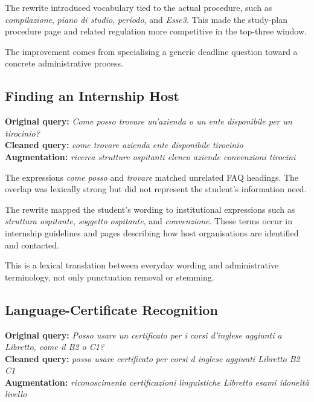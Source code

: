 \begin{effectbox}
The rewrite introduced vocabulary tied to the actual procedure, such as \emph{compilazione}, \emph{piano di studio}, \emph{periodo}, and \emph{Esse3}. This made the study-plan procedure page and related regulation more competitive in the top-three window.
\end{effectbox}

The improvement comes from specialising a generic deadline question toward a concrete administrative process.

\subsection{Finding an Internship Host}

\textbf{Original query:} \emph{Come posso trovare un'azienda o un ente disponibile per un tirocinio?}\\
\textbf{Cleaned query:} \emph{come trovare azienda ente disponibile tirocinio}\\
\textbf{Augmentation:} \emph{ricerca strutture ospitanti elenco aziende convenzioni tirocini}

\begin{failurebox}
The expressions \emph{come posso} and \emph{trovare} matched unrelated FAQ headings. The overlap was lexically strong but did not represent the student's information need.
\end{failurebox}

\begin{effectbox}
The rewrite mapped the student's wording to institutional expressions such as \emph{struttura ospitante}, \emph{soggetto ospitante}, and \emph{convenzione}. These terms occur in internship guidelines and pages describing how host organisations are identified and contacted.
\end{effectbox}

This is a lexical translation between everyday wording and administrative terminology, not only punctuation removal or stemming.

\subsection{Language-Certificate Recognition}

\textbf{Original query:} \emph{Posso usare un certificato per i corsi d'inglese aggiunti a Libretto, come il B2 o C1?}\\
\textbf{Cleaned query:} \emph{posso usare certificato per corsi d inglese aggiunti Libretto B2 C1}\\
\textbf{Augmentation:} \emph{riconoscimento certificazioni linguistiche Libretto esami idoneità livello}

